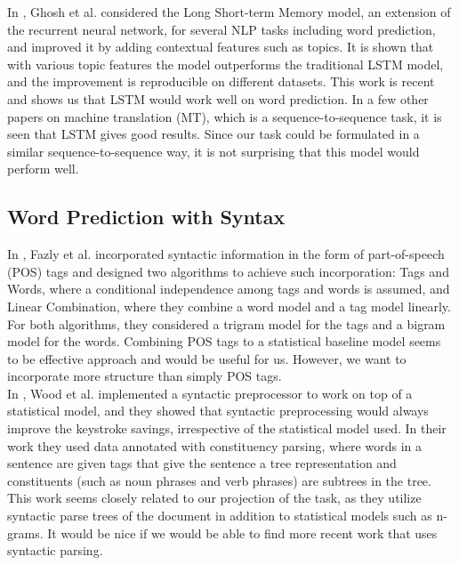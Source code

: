 \documentclass[14pt, oneside]{article}   	%
\begin{document}
In \cite{ghosh2016contextual},
Ghosh et al. considered the Long Short-term Memory model,
an extension of the recurrent neural network, for several NLP tasks including word prediction,
and improved it by adding contextual features such as topics.
It is shown that with various topic features the model outperforms the traditional LSTM model,
and the improvement is reproducible on different datasets.
This work is recent and shows us that LSTM would work well on word prediction.
In a few other papers on machine translation (MT),
which is a sequence-to-sequence task, it is seen that LSTM gives good results.
Since our task could be formulated in a similar sequence-to-sequence way,
it is not surprising that this model would perform well.

\subsection{Word Prediction with Syntax}
In \cite{fazly2003testing},
Fazly et al. incorporated syntactic information in the form of part-of-speech (POS) tags
and designed two algorithms to achieve such incorporation:
Tags and Words, where a conditional independence among tags and words is assumed,
and Linear Combination, where they combine a word model and a tag model linearly.
For both algorithms, they considered a trigram model for the tags
and a bigram model for the words.
Combining POS tags to a statistical baseline model seems to be effective approach
and would be useful for us.
However, we want to incorporate more structure than simply POS tags.\\

In \cite{wood1996windmill},
Wood et al. implemented a syntactic preprocessor to work on top of a statistical model,
and they showed that syntactic preprocessing would always improve the keystroke savings,
irrespective of the statistical model used.
In their work they used data annotated with constituency parsing,
where words in a sentence are given tags that give the sentence a tree representation
and constituents (such as noun phrases and verb phrases) are subtrees in the tree.
This work seems closely related to our projection of the task,
as they utilize syntactic parse trees of the document in addition to statistical models
such as n-grams.
It would be nice if we would be able to find more recent work that uses syntactic parsing.\\
\end{document}
